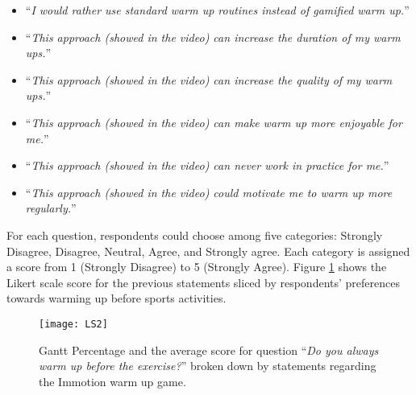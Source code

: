 \begin{itemize}
\item ``\textit{I would rather use standard warm up routines instead of gamified warm up.}''
\item ``\textit{This approach (showed in the video) can increase the duration of my warm ups.}''
\item ``\textit{This approach (showed in the video) can increase the quality of my warm ups.}''
\item ``\textit{This approach (showed in the video) can make warm up more enjoyable for me.}''
\item ``\textit{This approach (showed in the video) can never work in practice for me.}''
\item ``\textit{This approach (showed in the video) could motivate me to warm up more regularly.}''
\end{itemize}
For each question, respondents could choose among five categories: Strongly Disagree, Disagree, Neutral, Agree, and Strongly agree. Each category is assigned a score from 1 (Strongly Disagree) to 5 (Strongly Agree). Figure \ref{fig:LS2} shows the Likert scale score for the previous statements sliced by respondents' preferences towards warming up before sports activities.\\ 
\begin{figure}[h]
    \centering
    \texttt{[image: LS2]}
    \caption{Gantt Percentage and the average score for question ``\textit{Do you always warm up before the exercise?}'' broken down by statements regarding the Immotion warm up game.}
    \label{fig:LS2}
\end{figure}\\ 

